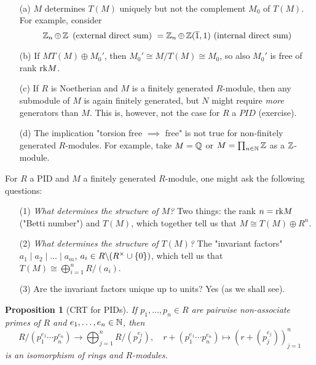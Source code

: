 \documentclass[11pt]{book}
\newcounter{counter}
\newtheorem{proposition}[counter]{Proposition}   \newtheorem{problem}[counter]{Problem}   \newtheorem*{proposition*}{Proposition}   \newtheorem*{lemma*}{Lemma}
\theoremstyle{definition}   \newtheorem{defn}[counter]{Definition} %
\newcommand{\ov}{\overline}   \newcommand{\wt}{\widetilde}
\newcommand{\bs}{\backslash}   \newcommand{\A}{\mathcal{A}}   \newcommand{\sy}{\textnormal{Syl}}   \newcommand{\size}[1]{\left| #1 \right|}
\newcommand{\vs}{\vspace{8pt}}
\numberwithin{counter}{chapter}
\begin{document}
\vs

\begin{remark}\
\begin{enumerate}
\item[(a)] $M$ determines $T(M)$ uniquely but not the complement $M_0$ of $T(M)$. For example, consider \[ \z_n \oplus \z \tn{ (external direct sum) } = \z_n \oplus \z(\ov{1},1) \tn{ (internal direct sum)} \]
\item[(b)] If $M  T(M) \oplus M_0'$, then $M_0' \cong M/T(M) \cong M_0$, so also $M_0'$ is free of rank $\textnormal{rk} M$.

\item[(c)] If $R$ is Noetherian and $M$ is a finitely generated $R$-module, then any submodule of $M$ is again finitely generated, but $N$ might require \emph{more} generators than $M$. This is, however, not the case for $R$ a $PID$ (exercise).

\item[(d)] The implication "torsion free $\implies$ free" is not true for non-finitely generated $R$-modules. For example, take $M = \operatorname{\mathbb{Q}}$ or $M = \prod_{n \in \operatorname{\mathbb{N}}} \operatorname{\mathbb{Z}}$ as a $\operatorname{\mathbb{Z}}$-module.
\end{enumerate}
\end{remark}

\vs

For $R$ a PID and $M$ a finitely generated $R$-module, one might ask the following questions:
\begin{enumerate}
\item[(1)] \textit{What determines the structure of $M$?} Two things: the rank $n = \textnormal{rk} M$ ("Betti number") and $T(M)$, which together tell us that $M \cong T(M) \oplus R^n$.

\item[(2)] \textit{What determines the structure of $T(M)$?} The "invariant factors" $a_1 \mid a_2 \mid \dots \mid a_m$, $a_i \in R \bs (R\x \cup \{0\})$, which tell us that $T(M) \cong \bigoplus_{i=1}^n R/(a_i)$.

\item[(3)] Are the invariant factors unique up to units? Yes (as we shall see).
\end{enumerate}

\vs

\begin{proposition}[CRT for PIDs]
If $p_1,\dots,p_n \in R$ are pairwise non-associate primes of $R$ and $e_1,\dots,e_n \in \operatorname{\mathbb{N}}$, then
	\[R/(p_1^{e_1}\cdots p_n^{e_n}) \longrightarrow \bigoplus_{j=1}^n R/(p_J^{e_j}), \quad r+(p_1^{e_1}\cdots p_n^{e_n}) \mapsto (r+(p_j^{e_j}))_{j=1}^n \]
is an isomorphism of rings and $R$-modules.
\end{proposition}
\end{document}

